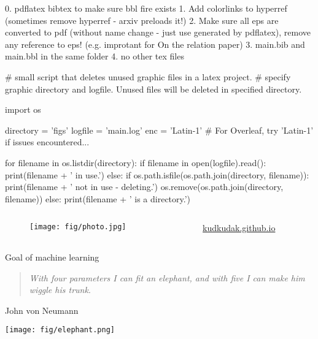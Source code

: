 
0. pdflatex bibtex to make sure bbl fire exists
1. Add colorlinks to hyperref (sometimes remove hyperref - arxiv preloads it!)
2. Make sure all eps are converted to pdf (without name change - just use generated by pdflatex), remove any
reference to eps! (e.g. improtant for On the relation paper)
3. main.bib and main.bbl in the same folder
4. no other tex files 


# small script that deletes unused graphic files in a latex project.
# specify graphic directory and logfile. Unused files will be deleted in specified directory.

import os

directory = 'figs'
logfile = 'main.log'
enc = 'Latin-1' # For Overleaf, try 'Latin-1' if issues encountered...

for filename in os.listdir(directory):
    if filename in open(logfile).read():
        print(filename + ' in use.')
    else:
        if os.path.isfile(os.path.join(directory, filename)):
            print(filename + ' not in use - deleting.')
            os.remove(os.path.join(directory, filename))
        else:
            print(filename + ' is a directory.')


\begin{columns}[T] %
\begin{column}{.25\textwidth}
\begin{figure}
 \texttt{[image: fig/photo.jpg]}
 \end{figure}
\end{column}%
\hfill
\begin{column}{.48\textwidth}

\Large
\href{kudkudak.github.io}{kudkudak.github.io}
\end{column}%
\end{columns}


\begin{frame}{Goal of machine learning}
\begin{quote}
\textit{With four parameters I can fit an elephant, and with five I can make him wiggle his trunk}.
\end{quote}
\hspace{8cm} John von Neumann
\begin{center}
\texttt{[image: fig/elephant.png]}
\end{center}
\end{frame}

